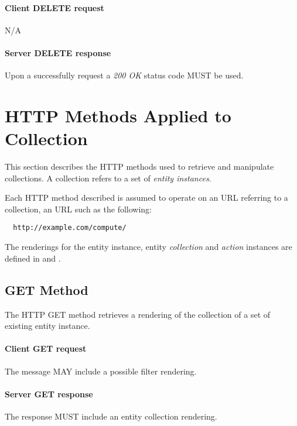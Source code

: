 \documentclass[10pt,a4paper]{article}
\begin{document}
\paragraph{Client DELETE request}
N/A

\paragraph{Server DELETE response}
Upon a successfully request a \emph{200 OK} status code MUST be used.

\section{HTTP Methods Applied to Collection}





This section describes the HTTP methods used to retrieve and manipulate
collections. A collection refers to a set of {\em entity instances}.

Each HTTP method described is assumed to operate
on an URL referring to a collection, an URL such as the following:
\begin{verbatim}
  http://example.com/compute/
\end{verbatim}

The renderings for the entity instance, entity {\em collection} and {\em action} instances are defined in \cite{occi:text} and \cite{occi:json}.

\subsection{GET Method}
The HTTP GET method retrieves a rendering of the collection of a set of existing entity instance.

\paragraph{Client GET request}
The message MAY include a possible filter rendering.

\paragraph{Server GET response}
The response MUST include an entity collection rendering.
\end{document}

